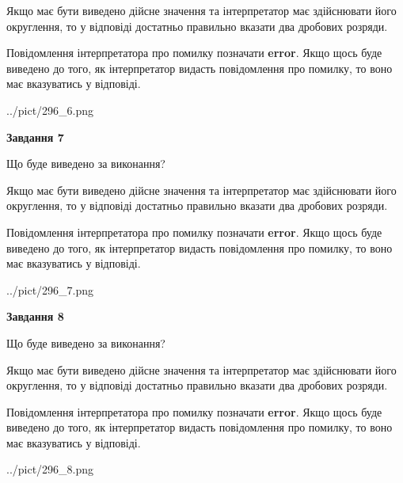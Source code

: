 \documentclass[12pt, ukrainian]{article}
\begin{document}
{\begin {Large}
Якщо має бути виведено дійсне значення та інтерпретатор має здійснювати його округлення, 
то у відповіді достатньо правильно вказати два дробових розряди.

Повідомлення інтерпретатора про помилку позначати \textbf{error}.
Якщо щось буде виведено до того, як інтерпретатор видасть повідомлення про помилку, 
то воно має вказуватись у відповіді. \par

\begin{center}
	{../pict/296_6.png}
\end{center}
\newpage

{\begin {center}\textbf{Завдання 7}\end {center}}\par
Що буде виведено за виконання? \par

Якщо має бути виведено дійсне значення та інтерпретатор має здійснювати його округлення, 
то у відповіді достатньо правильно вказати два дробових розряди.

Повідомлення інтерпретатора про помилку позначати \textbf{error}.
Якщо щось буде виведено до того, як інтерпретатор видасть повідомлення про помилку, 
то воно має вказуватись у відповіді. \par

\begin{center}
	{../pict/296_7.png}
\end{center}
\newpage

{\begin {center}\textbf{Завдання 8}\end {center}}\par
Що буде виведено за виконання? \par

Якщо має бути виведено дійсне значення та інтерпретатор має здійснювати його округлення, 
то у відповіді достатньо правильно вказати два дробових розряди.

Повідомлення інтерпретатора про помилку позначати \textbf{error}.
Якщо щось буде виведено до того, як інтерпретатор видасть повідомлення про помилку, 
то воно має вказуватись у відповіді. \par

\begin{center}
	{../pict/296_8.png}
\end{center}
\newpage


\end{Large}}
\end{document}
